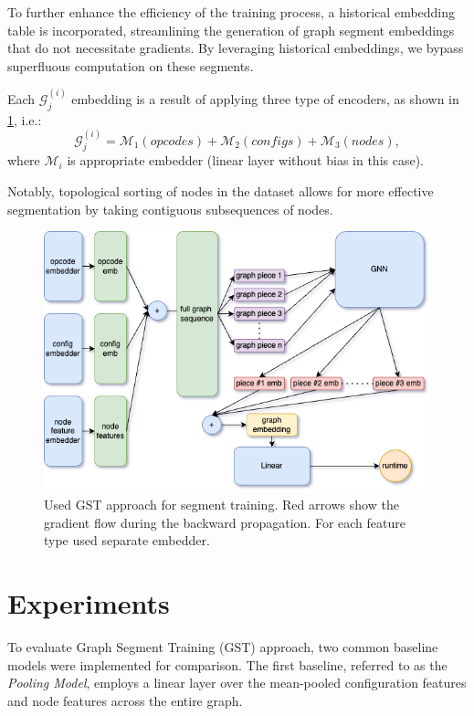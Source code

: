 \documentclass{article}
\begin{document}
To further enhance the efficiency of the training process, a historical embedding table is incorporated, streamlining the generation of graph segment embeddings that do not necessitate gradients. By leveraging historical embeddings, we bypass superfluous computation on these segments.

Each $\mathcal{G}^{(i)}_{j}$ embedding is a result of applying three type of encoders, as shown in \ref{fig:main_schema}, i.e.:
$$
\mathcal{G}^{(i)}_{j} = \mathcal{M}_1(opcodes) + \mathcal{M}_2(configs) + \mathcal{M}_3(nodes),
$$
where $\mathcal{M}_i$ is appropriate embedder (linear layer without bias in this case).

Notably, topological sorting of nodes in the dataset allows for more effective segmentation by taking contiguous subsequences of nodes.

\begin{figure}
\label{fig:main_schema}
    \centering
    \includegraphics[scale=0.6]{figures/main_schema.png}
    \caption{Used GST approach for segment training. Red arrows show the gradient flow during the backward propagation. For each feature type used separate embedder.}
\end{figure}
\section{Experiments}

To evaluate Graph Segment Training (GST) approach, two common baseline models were implemented for comparison. The first baseline, referred to as the \textit{Pooling Model}, employs a linear layer over the mean-pooled configuration features and node features across the entire graph.
\end{document}
